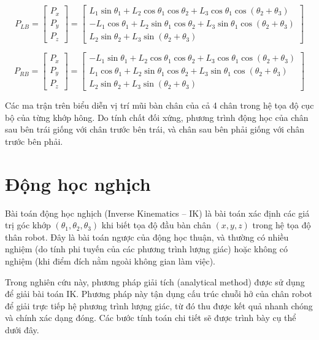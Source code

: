 \begin{equation}
P_{LB}=
\begin{bmatrix}
P_x \\
P_y \\
P_z
\end{bmatrix}
=
\begin{bmatrix}
L_1\sin\theta_1 + L_2\cos\theta_1\cos\theta_2 + L_3\cos\theta_1\cos(\theta_2+\theta_3) \\
- L_1\cos\theta_1 + L_2\sin\theta_1\cos\theta_2 + L_3\sin\theta_1\cos(\theta_2+\theta_3) \\
L_2\sin\theta_2 + L_3\sin(\theta_2+\theta_3)
\end{bmatrix}
\label{eq:3}
\end{equation}

\begin{equation}
P_{RB}=
\begin{bmatrix}
P_x \\
P_y \\
P_z
\end{bmatrix}
=
\begin{bmatrix}
- L_1\sin\theta_1 + L_2\cos\theta_1\cos\theta_2 + L_3\cos\theta_1\cos(\theta_2+\theta_3) \\
L_1\cos\theta_1 + L_2\sin\theta_1\cos\theta_2 + L_3\sin\theta_1\cos(\theta_2+\theta_3) \\
L_2\sin\theta_2 + L_3\sin(\theta_2+\theta_3)
\end{bmatrix}
\label{eq:4}
\end{equation}

Các ma trận trên biểu diễn vị trí mũi bàn chân của cả 4 chân trong hệ tọa độ cục bộ của từng khớp hông. Do tính chất đối xứng, phương trình động học của chân sau bên trái giống với chân trước bên trái, và chân sau bên phải giống với chân trước bên phải.

\section{Động học nghịch }

Bài toán động học nghịch (Inverse Kinematics -- IK) là bài toán xác định các giá trị góc khớp $(\theta_1, \theta_2, \theta_3)$ khi biết tọa độ đầu bàn chân $(x, y, z)$ trong hệ tọa độ thân robot. Đây là bài toán ngược của động học thuận, và thường có nhiều nghiệm (do tính phi tuyến của các phương trình lượng giác) hoặc không có nghiệm (khi điểm đích nằm ngoài không gian làm việc).

Trong nghiên cứu này, phương pháp giải tích (analytical method) được sử dụng để giải bài toán IK. Phương pháp này tận dụng cấu trúc chuỗi hở của chân robot để giải trực tiếp hệ phương trình lượng giác, từ đó thu được kết quả nhanh chóng và chính xác dạng đóng. Các bước tính toán chi tiết sẽ được trình bày cụ thể dưới đây.

